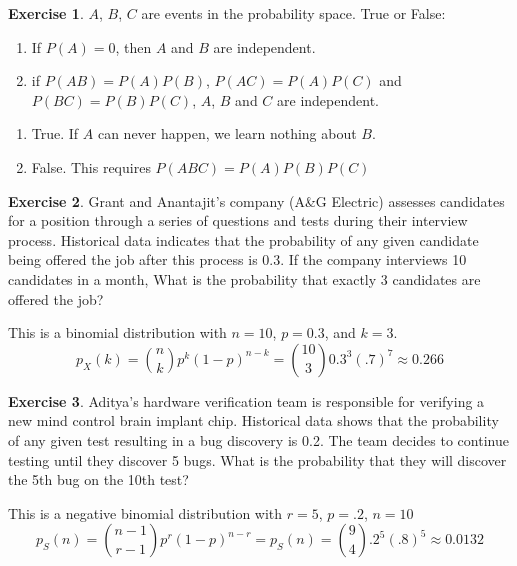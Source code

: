 \documentclass[12pt]{amsart}
\theoremstyle{definition}
\newtheorem{exercise}{Exercise}
\numberwithin{equation}{section}
\theoremstyle{plain}
\begin{document}
 

\begin{exercise}
    $A$, $B$, $C$ are events in the probability space. True or False:
\begin{enumerate}[label=\Alph*.]
        \item If $P(A)=0$, then $A$ and $B$ are independent.
        \item if $P(AB) = P(A)P(B)$, $P(AC) = P(A)P(C)$ and $P(BC) = P(B)P(C)$, $A$, $B$ and $C$ are independent. 
    \end{enumerate}
    \begin{answer}
\begin{enumerate}[label=\Alph*.]
            \item True. If $A$ can never happen, we learn nothing about $B$.
            \item False. This requires $P(ABC) = P(A) P(B) P(C)$
        \end{enumerate}
    \end{answer}
\end{exercise}

 

\begin{exercise}
    Grant and Anantajit's company (A\&G Electric) assesses candidates for a position through a series of questions and tests during their interview process. Historical data indicates that the probability of any given candidate being offered the job after this process is 0.3. If the company interviews 10 candidates in a month, What is the probability that exactly 3 candidates are offered the job?%
    \begin{answer}
    This is a binomial distribution with $n = 10$, $p = 0.3$, and $k = 3$.
    $$ p_X(k) = {n\choose k}p^k(1-p)^{n-k} = {10\choose 3}0.3^3(.7)^7 \approx 0.266$$
    \end{answer}
\end{exercise}

 

\begin{exercise}
    Aditya's hardware verification team is responsible for verifying a new mind control brain implant chip. Historical data shows that the probability of any given test resulting in a bug discovery is 0.2. The team decides to continue testing until they discover 5 bugs. What is the probability that they will discover the 5th bug on the 10th test?%
    \begin{answer}
    This is a negative binomial distribution with $r = 5$, $p = .2$, $n=10$
    $$ p_S(n) = {n - 1\choose r - 1}p^r(1-p)^{n-r} = p_S(n) = {9\choose 4}.2^5(.8)^{5}\approx 0.0132$$
    
    \end{answer}
\end{exercise}
\end{document}

